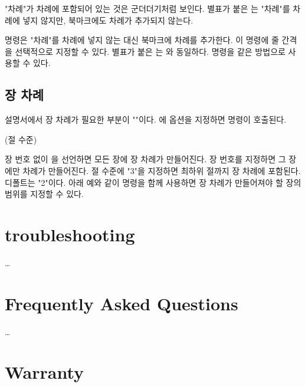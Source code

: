 \documentclass[minted]{hzguide}
\begin{document}
"차례"가 차례에 포함되어 있는 것은 군더더기처럼 보인다.
별표가 붙은 \macro{\tableofcontents*}는 "차례"를 차례에 넣지 않지만, 북마크에도 차례가 추가되지 않는다.

\begin{code}
\TableOfContents[줄 간격]
\TableOfContents*[1.1]
\ListOfFigures[줄 간격]
\end{code}

\macro{\TableOfContents} 명령은 "차례"를 차례에 넣지 않는 대신 북마크에 차례를 추가한다.
이 명령에 줄 간격을 선택적으로 지정할 수 있다.
별표가 붙은 \macro{\TableOfContents*}는 \macro{\tableofcontents}와 동일하다.
\macro{\ListOfFigures} 명령을 같은 방법으로 사용할 수 있다.

\section{장 차례}

설명서에서 장 차례가 필요한 부분이 ""이다.
\macro{\HeadingSetup}에  옵션을 지정하면 \macro{\ChapterContentsEnable} 명령이 호출된다.

\begin{code}
\ChapterContentsEnable[장 번호](절 수준)
\ChapterContentsDisable
\end{code}

장 번호 없이 \macro{\ChapterContentsEnable}을 선언하면 모든 장에 장 차례가 만들어진다.
장 번호를 지정하면 그 장에만 차례가 만들어진다.
절 수준에 "3"을 지정하면 최하위 절\annotate*{\string\subsubsection}까지 장 차례에 포함된다.
디폴트는 "2"\annotate*{\string\subsection}이다.
아래 예와 같이 \macro{\ChapterContentsDisable} 명령을 함께 사용하면 장 차례가 만들어져야 할 장의 범위를 지정할 수 있다.

\begin{code}
\ChapterContentsEnable
\chapter{troubleshooting}
… 
\chapter{Frequently Asked Questions}
…
\ChapterContentsDisable
\chapter{Warranty}
\end{code}
\end{document}
